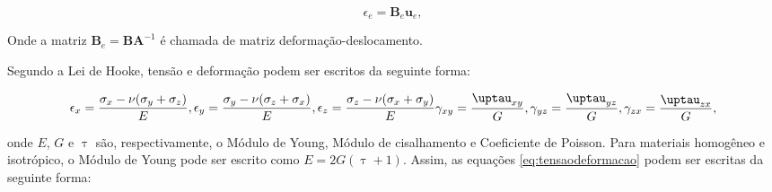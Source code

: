 \begin{equation} \label{eq:strain-displacement}
    \epsilon_{e} = \pmb{B}_{e}\pmb{u}_{e},
\end{equation}    

Onde a matriz $\pmb{B}_e = \pmb{B}\pmb{A}^{-1} $ é chamada de matriz deformação-deslocamento.


Segundo a Lei de Hooke, tensão e deformação podem ser escritos da seguinte forma:

\begin{equation} \label{eq:tensaodeformacao}
    \begin{aligned}
        \epsilon_{x} = \frac{\sigma_{x} - \nu(\sigma_{y} + \sigma_{z})}{E},
        \epsilon_{y} = \frac{\sigma_{y} - \nu(\sigma_{z} + \sigma_{x})}{E},
        \epsilon_{z} = \frac{\sigma_{z} - \nu(\sigma_{x} + \sigma_{y})}{E}
    \end{aligned}    \\
    
    \begin{aligned}
        \gamma_{xy} = \frac{\uptau_{xy}}{G},
        \gamma_{yz} = \frac{\uptau_{yz}}{G},
        \gamma_{zx} = \frac{\uptau_{zx}}{G},
    \end{aligned}
\end{equation}

onde $E$, $G$ e $\uptau$ são, respectivamente, o Módulo de Young, Módulo de cisalhamento e Coeficiente de Poisson.
Para materiais homogêneo e isotrópico, o Módulo de Young pode ser escrito como $E = 2G(\uptau + 1)$. Assim, as equações \ref{eq:tensaodeformacao} podem ser escritas da seguinte forma:
